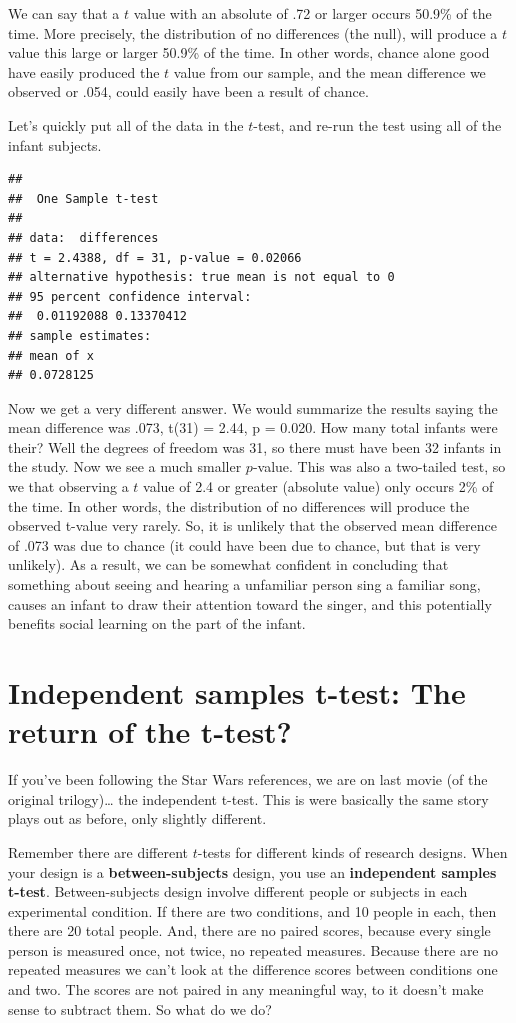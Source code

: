 \documentclass[
]{book}
\begin{document}
We can say that a \(t\) value with an absolute of .72 or larger occurs 50.9\% of the time. More precisely, the distribution of no differences (the null), will produce a \(t\) value this large or larger 50.9\% of the time. In other words, chance alone good have easily produced the \(t\) value from our sample, and the mean difference we observed or .054, could easily have been a result of chance.

Let's quickly put all of the data in the \(t\)-test, and re-run the test using all of the infant subjects.

\begin{verbatim}
## 
##  One Sample t-test
## 
## data:  differences
## t = 2.4388, df = 31, p-value = 0.02066
## alternative hypothesis: true mean is not equal to 0
## 95 percent confidence interval:
##  0.01192088 0.13370412
## sample estimates:
## mean of x 
## 0.0728125
\end{verbatim}

Now we get a very different answer. We would summarize the results saying the mean difference was .073, t(31) = 2.44, p = 0.020. How many total infants were their? Well the degrees of freedom was 31, so there must have been 32 infants in the study. Now we see a much smaller \(p\)-value. This was also a two-tailed test, so we that observing a \(t\) value of 2.4 or greater (absolute value) only occurs 2\% of the time. In other words, the distribution of no differences will produce the observed t-value very rarely. So, it is unlikely that the observed mean difference of .073 was due to chance (it could have been due to chance, but that is very unlikely). As a result, we can be somewhat confident in concluding that something about seeing and hearing a unfamiliar person sing a familiar song, causes an infant to draw their attention toward the singer, and this potentially benefits social learning on the part of the infant.

\section{Independent samples t-test: The return of the t-test?}\label{independent-samples-t-test-the-return-of-the-t-test}

If you've been following the Star Wars references, we are on last movie (of the original trilogy)\ldots{} the independent t-test. This is were basically the same story plays out as before, only slightly different.

Remember there are different \(t\)-tests for different kinds of research designs. When your design is a \textbf{between-subjects} design, you use an \textbf{independent samples t-test}. Between-subjects design involve different people or subjects in each experimental condition. If there are two conditions, and 10 people in each, then there are 20 total people. And, there are no paired scores, because every single person is measured once, not twice, no repeated measures. Because there are no repeated measures we can't look at the difference scores between conditions one and two. The scores are not paired in any meaningful way, to it doesn't make sense to subtract them. So what do we do?
\end{document}
